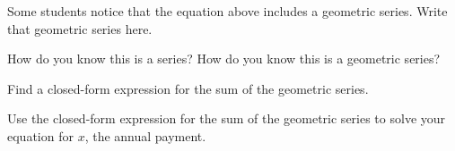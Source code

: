 \documentclass[handout,space,nooutcomes]{ximera}
\begin{document}
\begin{question}
Some students notice that the equation above includes a geometric series.  Write that geometric series here.
\begin{freeResponse}
\end{freeResponse}
\end{question}

\begin{question}
How do you know this is a series?  How do you know this is a geometric series?   
\begin{freeResponse}
\end{freeResponse}
\end{question}

\begin{question}
Find a closed-form expression for the sum of the geometric series.  
\begin{freeResponse}
\end{freeResponse}
\end{question}



\begin{question}
Use the closed-form expression for the sum of the geometric series to solve your equation for $x$, the annual payment.   
\begin{freeResponse}
\end{freeResponse}
\end{question}
\end{document}
